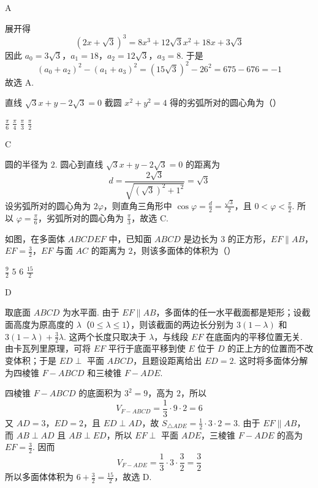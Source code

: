 \documentclass[UTF8,a4paper,oneside,11pt]{ctexbook}
\begin{document}
\begin{answer}
A
\end{answer}

\begin{solution}
展开得
\[
(2x+\sqrt3)^3=8x^3+12\sqrt3x^2+18x+3\sqrt3
\]
因此 \(a_0=3\sqrt3\)，\(a_1=18\)，\(a_2=12\sqrt3\)，\(a_3=8\). 于是
\[
(a_0+a_2)^2-(a_1+a_3)^2=(15\sqrt3)^2-26^2=675-676=-1
\]
故选 A.
\end{solution}

\begin{problem}
直线 \(\sqrt3x+y-2\sqrt3=0\) 截圆 \(x^2+y^2=4\) 得的劣弧所对的圆心角为（\quad）

\choices
    {\(\frac{\pi}{6}\)}
    {\(\frac{\pi}{4}\)}
    {\(\frac{\pi}{3}\)}
    {\(\frac{\pi}{2}\)}
\end{problem}

\begin{answer}
C
\end{answer}

\begin{solution}
圆的半径为 \(2\). 圆心到直线
\(\sqrt3x+y-2\sqrt3=0\) 的距离为
\[
d=\frac{2\sqrt3}{\sqrt{(\sqrt3)^2+1^2}}=\sqrt3
\]
设劣弧所对的圆心角为 \(2\varphi\)，则直角三角形中
\(\cos\varphi=\frac{d}{2}=\frac{\sqrt3}{2}\)，且 \(0<\varphi<\frac{\pi}{2}\). 所以 \(\varphi=\frac{\pi}{6}\)，劣弧所对的圆心角为 \(\frac{\pi}{3}\)，故选 C.
\end{solution}

\begin{problem}
如图，在多面体 \(ABCDEF\) 中，已知面 \(ABCD\) 是边长为 \(3\) 的正方形，\(EF\parallel AB\)，\(EF=\frac{3}{2}\)，\(EF\) 与面 \(AC\) 的距离为 \(2\)，则该多面体的体积为（\quad）


\choices
    {\(\frac{9}{2}\)}
    {\(5\)}
    {\(6\)}
    {\(\frac{15}{2}\)}
\end{problem}

\begin{answer}
D
\end{answer}

\begin{solution}
取底面 \(ABCD\) 为水平面. 由于 \(EF\parallel AB\)，多面体的任一水平截面都是矩形；设截面高度为原高度的 \(\lambda\)（\(0\leq\lambda\leq1\)），则该截面的两边长分别为
\(3(1-\lambda)\) 和 \(3(1-\lambda)+\frac32\lambda\). 这两个长度只取决于 \(\lambda\)，与线段 \(EF\) 在底面内的平移位置无关. 由卡瓦列里原理，可将 \(EF\) 平行于底面平移到使 \(E\) 位于 \(D\) 的正上方的位置而不改变体积；于是 \(ED\perp\) 平面 \(ABCD\)，且题设距离给出 \(ED=2\). 这时将多面体分解为四棱锥 \(F-ABCD\) 和三棱锥 \(F-ADE\).

四棱锥 \(F-ABCD\) 的底面积为 \(3^2=9\)，高为 \(2\)，所以
\[
V_{F-ABCD}=\frac13\cdot9\cdot2=6
\]
又 \(AD=3\)，\(ED=2\)，且 \(ED\perp AD\)，故
\(S_{\triangle ADE}=\frac12\cdot3\cdot2=3\). 由于 \(EF\parallel AB\)，而 \(AB\perp AD\) 且 \(AB\perp ED\)，所以 \(EF\perp\) 平面 \(ADE\)，三棱锥 \(F-ADE\) 的高为 \(EF=\frac32\). 因而
\[
V_{F-ADE}=\frac13\cdot3\cdot\frac32=\frac32
\]
所以多面体体积为
\(6+\frac32=\frac{15}{2}\)，故选 D.
\end{solution}
\end{document}
